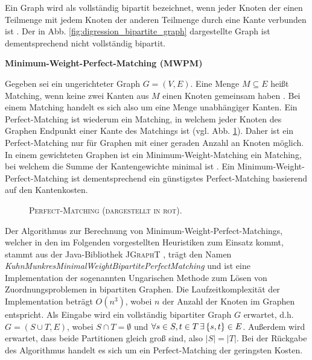 Ein Graph wird als vollständig bipartit bezeichnet, wenn jeder Knoten der einen Teilmenge mit jedem Knoten
der anderen Teilmenge durch eine Kante verbunden ist \cite{Knust2019}. Der in Abb. \ref{fig:digression_bipartite_graph}
dargestellte Graph ist dementsprechend nicht vollständig bipartit.

\textbf{Minimum-Weight-Perfect-Matching (\textsc{MWPM})}

Gegeben sei ein ungerichteter Graph $G = (V, E)$. Eine Menge $M \subseteq E$ heißt Matching,
wenn keine zwei Kanten aus $M$ einen Knoten gemeinsam haben \cite{Gibbons1985}. Bei einem Matching handelt es sich also
um eine Menge unabhängiger Kanten. Ein Perfect-Matching ist wiederum ein Matching, in welchem jeder Knoten des Graphen
Endpunkt einer Kante des Matchings ist \cite{Gibbons1985} (vgl. Abb. \ref{fig:perfect_matching}).
Daher ist ein Perfect-Matching nur für Graphen mit einer geraden Anzahl an Knoten möglich.
In einem gewichteten Graphen ist ein Minimum-Weight-Matching ein Matching, bei welchem die Summe der Kantengewichte
minimal ist \cite{Gibbons1985}. Ein Minimum-Weight-Perfect-Matching ist dementsprechend ein günstigstes Perfect-Matching
basierend auf den Kantenkosten.

\begin{figure}[H]
\centering
{}
\caption{\textsc{Perfect-Matching (dargestellt in rot).}}
\label{fig:perfect_matching}
\end{figure}

Der Algorithmus zur Berechnung von Minimum-Weight-Perfect-Matchings, welcher in den im Folgenden
vorgestellten Heuristiken zum Einsatz kommt, stammt aus der Java-Bibliothek \textsc{JGraphT} \cite{JGraphT}, trägt
den Namen \textit{KuhnMunkresMinimalWeightBipartitePerfectMatching} und ist eine Implementation der
sogenannten Ungarischen Methode zum Lösen von Zuordnungsproblemen in bipartiten Graphen.
Die Laufzeitkomplexität der Implementation beträgt $O(n^3)$, wobei $n$ der Anzahl der Knoten im Graphen entspricht.
Als Eingabe wird ein vollständig bipartiter Graph $G$ erwartet, d.h. $G= (S \cup T, E)$, wobei $S \cap T = \emptyset$ und
$\forall s \in S, t \in T \thinspace \exists \thinspace \{s, t\} \in E$. Außerdem wird erwartet, dass beide Partitionen gleich groß sind,
also $|S| = |T|$. Bei der Rückgabe des Algorithmus handelt es sich um ein Perfect-Matching der geringsten Kosten.

